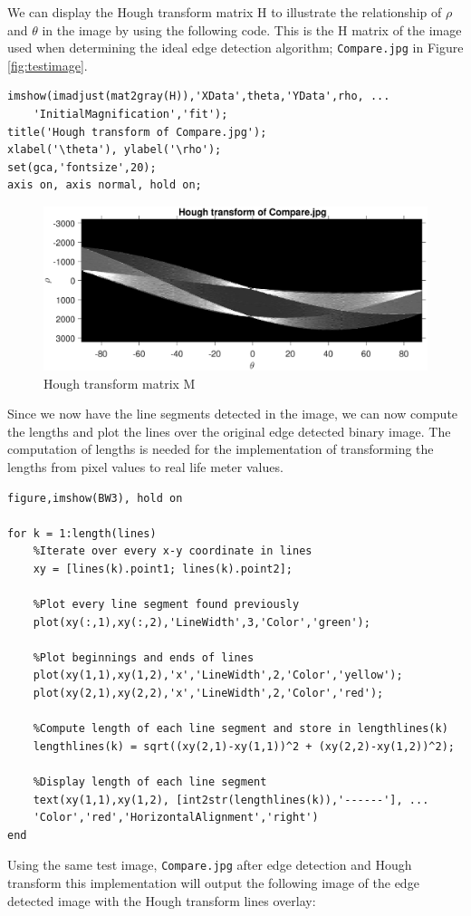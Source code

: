 We can display the Hough transform matrix H to illustrate the relationship of $\rho$ and $\theta$ in the image by using the following code. This is the H matrix of the image used when determining the ideal edge detection algorithm; \texttt{Compare.jpg} in Figure \ref{fig:testimage}.
\begin{lstlisting}[firstnumber=30]
%Display H matrix image of Compare.jpg
imshow(imadjust(mat2gray(H)),'XData',theta,'YData',rho, ...
	'InitialMagnification','fit');
title('Hough transform of Compare.jpg');
xlabel('\theta'), ylabel('\rho');
set(gca,'fontsize',20);
axis on, axis normal, hold on;
\end{lstlisting}
\begin{figure}[H]
\centering
\includegraphics[width=\textwidth]{fig/houghcompare}
  \caption{Hough transform matrix M}
  \label{fig:houghcompare}
\end{figure}

Since we now have the line segments detected in the image, we can now compute the lengths and plot the lines over the original edge detected binary image. The computation of lengths is needed for the implementation of transforming the lengths from pixel values to real life meter values. 

\begin{lstlisting}[firstnumber=37]
%Display the edge detected binary image BW3
figure,imshow(BW3), hold on

for k = 1:length(lines)
	%Iterate over every x-y coordinate in lines
	xy = [lines(k).point1; lines(k).point2];
    
    %Plot every line segment found previously
    plot(xy(:,1),xy(:,2),'LineWidth',3,'Color','green');
   	
   	%Plot beginnings and ends of lines
   	plot(xy(1,1),xy(1,2),'x','LineWidth',2,'Color','yellow');
   	plot(xy(2,1),xy(2,2),'x','LineWidth',2,'Color','red');    
    
   	%Compute length of each line segment and store in lengthlines(k)
   	lengthlines(k) = sqrt((xy(2,1)-xy(1,1))^2 + (xy(2,2)-xy(1,2))^2);
    
   	%Display length of each line segment
   	text(xy(1,1),xy(1,2), [int2str(lengthlines(k)),'------'], ...
   	'Color','red','HorizontalAlignment','right')    
end
\end{lstlisting}
Using the same test image, \texttt{Compare.jpg} after edge detection and Hough transform this implementation will output the following image of the edge detected image with the Hough transform lines overlay:


